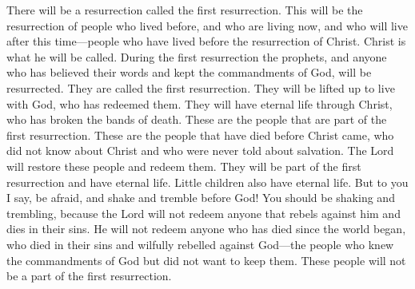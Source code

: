 There will be a resurrection called the first resurrection. This will be the resurrection of people who lived before, and who are living now, and who will live after this time---people who have lived before the resurrection of Christ. Christ is what he will be called.
\bverse \iffalse And now, the resurrection of all the prophets, and all those that have believed in their words, or all those that have kept the commandments of God, shall come forth in the first resurrection; therefore, they are the first resurrection. \fi
During the first resurrection the prophets, and anyone who has believed their words and kept the commandments of God, will be resurrected. They are called the first resurrection.
\bverse \iffalse They are raised to dwell with God who has redeemed them; thus they have eternal life through Christ, who has broken the bands of death. \fi
They will be lifted up to live with God, who has redeemed them. They will have eternal life through Christ, who has broken the bands of death.
\bverse \iffalse And these are those who have part in the first resurrection; and these are they that have died before Christ came, in their ignorance, not having salvation declared unto them. And thus the Lord bringeth about the restoration of these; and they have a part in the first resurrection, or have eternal life, being redeemed by the Lord. \fi
These are the people that are part of the first resurrection. These are the people that have died before Christ came, who did not know about Christ and who were never told about salvation. The Lord will restore these people and redeem them. They will be part of the first resurrection and have eternal life.
\bverse \iffalse And little children also have eternal life. \fi
Little children also have eternal life.
\bverse \iffalse But behold, and fear, and tremble before God, for ye ought to tremble; for the Lord redeemeth none such that rebel against him and die in their sins; yea, even all those that have perished in their sins ever since the world began, that have wilfully rebelled against God, that have known the commandments of God, and would not keep them; these are they that have no part in the first resurrection. \fi
But to you I say, be afraid, and shake and tremble before God! You should be shaking and trembling, because the Lord will not redeem anyone that rebels against him and dies in their sins. He will not redeem anyone who has died since the world began, who died in their sins and wilfully rebelled against God---the people who knew the commandments of God but did not want to keep them. These people will not be a part of the first resurrection.

